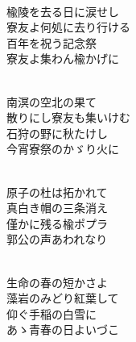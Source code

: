 \documentclass[10pt,b5j]{tarticle} %
\begin{document}
\vspace{1.5em} %
\newcommand{\linespace}{0.5em} %
\newcommand{\blocksize}{0.5\hsize} %
\newcommand{\itemmargin}{3em} %
\begin{enumerate} %
    \setlength{\itemindent}{\itemmargin} %
    \begin{minipage}[c]{\blocksize}
    
        \vspace{\linespace}
        \item~\\
        楡陵を去る日に涙せし\\
        寮友よ何処に去り行ける\\
        百年を祝う記念祭\\
        寮友よ集わん楡かげに
        
    \end{minipage}
    \begin{minipage}[c]{\blocksize}
        
        \vspace{\linespace}
        \item~\\
        南溟の空北の果て\\
        散りにし寮友も集いけむ\\
        石狩の野に秋たけし\\
        今宵寮祭のかゞり火に
        
    \end{minipage}
    \begin{minipage}[c]{\blocksize}
        
        \vspace{\linespace}
        \item~\\
        原子の杜は拓かれて\\
        真白き帽の三条消え\\
        僅かに残る楡ポプラ\\
        郭公の声あわれなり
        
    \end{minipage}
    \begin{minipage}[c]{\blocksize}
        
        \vspace{\linespace}
        \item~\\
        生命の春の短かさよ\\
        藻岩のみどり紅葉して\\
        仰ぐ手稲の白雪に\\
        あゝ青春の日よいづこ
        

\end{minipage}
\end{enumerate}
\end{document}
